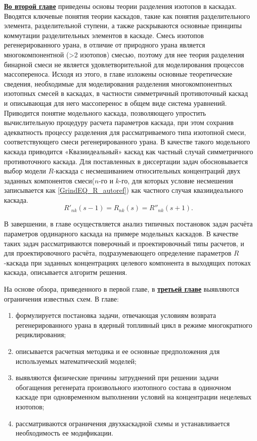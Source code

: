 \underline{\textbf{Во второй главе}} приведены основы теории разделения изотопов в каскадах. Вводятся ключевые понятия теории каскадов, такие как понятия разделительного элемента, разделительной ступени, а также раскрываются основные принципы коммутации разделительных элементов в каскаде. Смесь изотопов регенерированного урана, в отличие от природного урана является многокомпонентной (>2 изотопов) смесью, поэтому для нее теория разделения бинарной смеси не является удовлетворительной для моделирования процессов массопереноса. Исходя из этого, в главе изложены основные теоретические сведения, необходимые для моделирования разделения многокомпонентных изотопных смесей в каскадах, в частности симметричный противоточный каскад и описывающая для него массоперенос в общем виде система уравнений. Приводится понятие модельного каскада, позволяющего упростить вычислительную процедуру расчета параметров каскада, при этом сохранив адекватность процессу разделения для рассматриваемого типа изотопной смеси, соответствующего смеси регенерированного урана. В качестве такого модельного каскада приводится «Квазиидеальный» каскад как частный случай симметричного противоточного каскада. Для поставленных в диссертации задач обосновывается выбор модели $R$-каскада с несмешиванием относительных концентраций двух заданных компонентов смеси($n$-го и $k$-го, для которых условие несмешения записывается как \ref{GrindEQ_R_autoref}) как частного случая квазиидеального каскада.
\begin{equation} \label{GrindEQ_R_autoref} 
  R'_{nk} (s-1)=R_{nk} (s)=R''_{nk} (s+1).                                                 
\end{equation} 

В завершении, в главе осуществляется анализ типичных постановок задач расчёта параметров ординарного каскада на примере модельных каскадов. В качестве таких задач рассматриваются поверочный и проектировочный типы расчетов, и для проектировочного расчёта, подразумевающего определение параметров $R$-каскада при заданных концентрациях целевого компонента в выходящих потоках каскада, описывается алгоритм решения.

На основе обзора, приведенного в первой главе, в \underline{\textbf{третьей главе}} выявляются ограничения известных схем. 
В главе:
\begin{enumerate}
  \item формулируется постановка задачи, отвечающая условиям возврата регенерированного урана в ядерный топливный цикл в режиме многократного рециклирования;
  \item описывается расчетная методика и ее основные предположения для используемых математический моделей;
  \item выявляются физические причины затруднений при решении задачи обогащения регенерата произвольного изотопного состава в одиночном каскаде при одновременном выполнении условий на концентрации нецелевых изотопов;
  \item рассматриваются ограничения двухкаскадной схемы и устанавливается необходимость ее модификации.
\end{enumerate}

